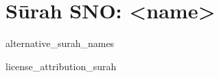 \begin{comment}
The following strings are to be replaced by a script, in order to use this file as a template (all upper case):-
* sNO = sūrah number, without leading zeros
* sZO = sūrah number, with leading zeros
\end{comment}
\begin{comment}
The following tags are declared here:-
alternative_surah_names
license_attribution_surah
\end{comment}
\section{Sūrah SNO: <name>}
\begin{taggedblock}{alternative_surah_names}
\end{taggedblock}
\END

\begin{taggedblock}{license_attribution_surah}

\end{taggedblock}